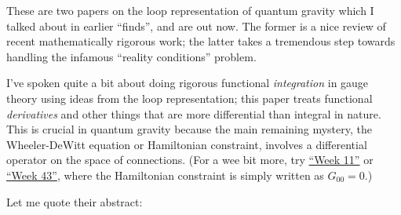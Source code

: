 \documentclass{article}
\def\tightlist{}
\renewcommand{\texttt}[1]{%
  \begingroup
  \ttfamily
  \begingroup\lccode`~=`/\lowercase{\endgroup\def~}{/\discretionary{}{}{}}%
  \begingroup\lccode`~=`[\lowercase{\endgroup\def~}{[\discretionary{}{}{}}%
  \begingroup\lccode`~=`.\lowercase{\endgroup\def~}{.\discretionary{}{}{}}%
  \catcode`/=\active\catcode`[=\active\catcode`.=\active
  \scantokens{#1\noexpand}%
  \endgroup
}
\begin{document}

These are two papers on the loop representation of quantum gravity which
I talked about in earlier ``finds'', and are out now. The former is a
nice review of recent mathematically rigorous work; the latter takes a
tremendous step towards handling the infamous ``reality conditions''
problem.

\noindent
I've spoken quite a bit about doing rigorous functional
\emph{integration} in gauge theory using ideas from the loop
representation; this paper treats functional \emph{derivatives} and
other things that are more differential than integral in nature. This is
crucial in quantum gravity because the main remaining mystery, the
Wheeler-DeWitt equation or Hamiltonian constraint, involves a
differential operator on the space of connections. (For a wee bit more,
try \protect\hyperlink{week11}{``Week 11''} or
\protect\hyperlink{week43}{``Week 43''}, where the Hamiltonian
constraint is simply written as \(G_{00} = 0\).)

Let me quote their abstract:
\end{document}
